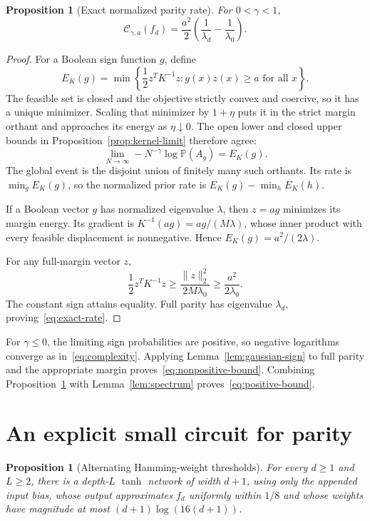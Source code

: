 \documentclass[11pt]{article}
\newtheorem{proposition}[theorem]{Proposition}
\theoremstyle{remark}
\newcommand{\Prb}{\mathbb P}
\begin{document}
\begin{proposition}[Exact normalized parity rate]
\label{prop:rate}
For $0<\gamma<1$,
\begin{equation}\label{eq:exact-rate}
 \mathcal C_{\gamma,a}(f_d)
 =\frac{a^2}{2}\left(\frac1{\lambda_d}-\frac1{\lambda_0}\right).
\end{equation}
\end{proposition}

\begin{proof}
For a Boolean sign function $g$, define
\[
 E_K(g)=\min\left\{\frac12z^TK^{-1}z:
                           g(x)z(x)\ge a\text{ for all }x\right\}.
\]
The feasible set is closed and the objective strictly convex and
coercive, so it has a unique minimizer. Scaling that minimizer by
$1+\eta$ puts it in the strict margin orthant and approaches its
energy as $\eta\downarrow0$. The open lower and closed upper bounds
in Proposition~\ref{prop:kernel-limit} therefore agree:
\[
 \lim_{N\to\infty}-N^{-\gamma}\log\Prb(A_g)=E_K(g).
\]
The global event is the disjoint union of finitely many such
orthants. Its rate is $\min_g E_K(g)$, so the normalized prior rate
is $E_K(g)-\min_hE_K(h)$.

If a Boolean vector $g$ has normalized eigenvalue $\lambda$, then
$z=ag$ minimizes its margin energy. Its gradient is
$K^{-1}(ag)=ag/(M\lambda)$, whose inner product with every
feasible displacement is nonnegative. Hence
$E_K(g)=a^2/(2\lambda)$.

For any full-margin vector $z$,
\[
 \frac12z^TK^{-1}z
 \ge \frac{\|z\|_2^2}{2M\lambda_0}
 \ge \frac{a^2}{2\lambda_0}.
\]
The constant sign attains equality. Full parity has eigenvalue
$\lambda_d$, proving~\eqref{eq:exact-rate}.
\end{proof}

For $\gamma\le0$, the limiting sign probabilities are positive,
so negative logarithms converge as in~\eqref{eq:complexity}.
Applying Lemma~\ref{lem:gaussian-sign} to full parity and the
appropriate margin proves~\eqref{eq:nonpositive-bound}.
Combining Proposition~\ref{prop:rate} with
Lemma~\ref{lem:spectrum} proves~\eqref{eq:positive-bound}.

\section{An explicit small circuit for parity}

\begin{proposition}[Alternating Hamming-weight thresholds]
\label{prop:circuit}
For every $d\ge1$ and $L\ge2$, there is a depth-$L$ $\tanh$ network
of width $d+1$, using only the appended input bias, whose output
approximates $f_d$ uniformly within $1/8$ and whose weights have
magnitude at most $(d+1)\log(16(d+1))$.
\end{proposition}
\end{document}
